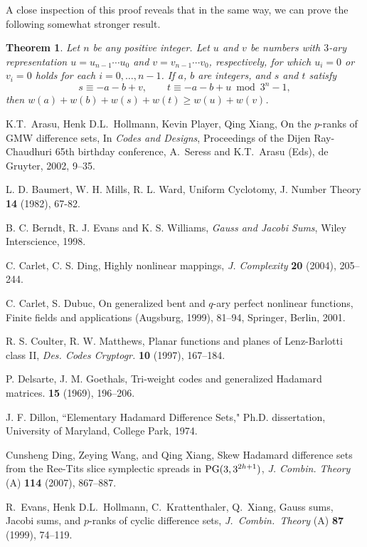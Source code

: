 \documentclass[11pt, reqno]{amsart}
\newtheorem{teor}{Theorem}[section]
\begin{document}
A close inspection of this proof reveals that in the same way, we can prove the
following somewhat stronger result.
\begin{teor}\label{Tgengenwi}
Let $n$ be any positive integer. Let $u$ and $v$ be numbers with $3$-ary
representation $u=u_{n-1}\cdots u_0$ and $v=v_{n-1}\cdots v_0$, respectively,
for which $u_i=0$ or $v_i=0$ holds for each $i=0, \ldots, n-1$.
If $a$, $b$ are integers, and $s$ and $t$ satisfy
\[ s \equiv -a-b+v, \qquad t \equiv -a-b+u \bmod 3^n-1, \]
then $w(a)+w(b)+w(s)+w(t)\geq w(u)+w(v)$.
\end{teor}
%

\begin{thebibliography}{A}

K.T.\ Arasu, Henk D.L.\ Hollmann, Kevin Player, Qing Xiang, On the
$p$-ranks of GMW difference sets, In {\it Codes and Designs},
Proceedings of the Dijen Ray-Chaudhuri 65th birthday conference, A.\
Seress and K.T.\ Arasu (Eds), de Gruyter, 2002, 9--35.

L. D. Baumert, W. H. Mills, R. L. Ward, Uniform Cyclotomy, J. Number Theory {\bf 14} (1982), 67-82.

 B. C. Berndt, R. J. Evans and K. S. Williams,
{\it Gauss and Jacobi Sums}, Wiley Interscience, 1998.

 C. Carlet, C. S. Ding, Highly nonlinear mappings,  {\it J. Complexity} {\bf  20} (2004), 205--244.

 C. Carlet, S. Dubuc, On generalized bent and $q$-ary perfect
nonlinear functions, Finite fields and applications (Augsburg, 1999), 81--94, Springer, Berlin, 2001.

 R. S. Coulter, R. W. Matthews, Planar functions and planes of Lenz-Barlotti class II, {\it Des. Codes Cryptogr.} {\bf 10} (1997), 167--184.

 P. Delsarte, J. M. Goethals,
\newblock Tri-weight codes and generalized {H}adamard matrices.
 \textbf{15} (1969), 196--206.

 J. F. Dillon, ``Elementary Hadamard Difference Sets," Ph.D.
dissertation, University of Maryland, College Park, 1974.

 Cunsheng Ding, Zeying Wang, and Qing Xiang, Skew Hadamard difference sets from the Ree-Tits slice symplectic
spreads in ${\rm PG}(3,3^{2h+1})$, {\it J. Combin. Theory} (A) {\bf
114 } (2007), 867--887.

 R.\ Evans, Henk D.L.\ Hollmann, C.\ Krattenthaler,
    Q.\ Xiang, Gauss sums, Jacobi sums, and $p$-ranks of cyclic
    difference sets, {\it J.\ Combin.\ Theory} (A)
    {\bf 87} (1999), 74--119.


\end{thebibliography}
\end{document}
